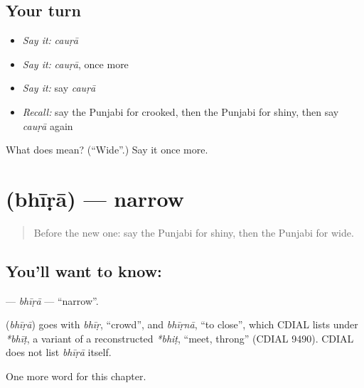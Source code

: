 \subsection*{Your turn}
\begin{itemize}
\raggedright
  \item \emph{Say it:} \emph{cauṛā}
  \item \emph{Say it:} \emph{cauṛā}, once more
  \item \emph{Say it:} say \emph{cauṛā}
  \item \emph{Recall:} say the Punjabi for crooked, then the Punjabi for shiny, then say \emph{cauṛā} again
\end{itemize}

\begin{tcolorbox}[breakable,colback=teal!4,colframe=teal!35!black,title={Before you move on}]
What does  mean? (\textquotedblleft{}Wide\textquotedblright{}.) Say it once more.
\end{tcolorbox}
\section[\texorpdfstring{\pa{ਭੀੜਾ} (bhīṛā)}{ਭੀੜਾ (bhīṛā)}]{ (bhīṛā) — narrow}

\label{lesson:PA-C142-bhira}



\begin{quote}
Before the new one: say the Punjabi for shiny, then the Punjabi for wide.
\end{quote}

\subsection*{You'll want to know: }
\textbf{} — \emph{bhīṛā} — \textquotedblleft{}narrow\textquotedblright{}.

\begin{cousinweb}
\textbf{} (\emph{bhīṛā}) goes with \emph{bhīṛ}, \textquotedblleft{}crowd\textquotedblright{}, and \emph{bhīṛnā}, \textquotedblleft{}to close\textquotedblright{}, which CDIAL lists under \emph{*bhīṭ}, a variant of a reconstructed \emph{*bhiṭ}, \textquotedblleft{}meet, throng\textquotedblright{} (CDIAL 9490). CDIAL does not list \emph{bhīṛā} itself.
\end{cousinweb}

\begin{grammarlens}[title={What you've built}]
One more word for this chapter.
\end{grammarlens}

